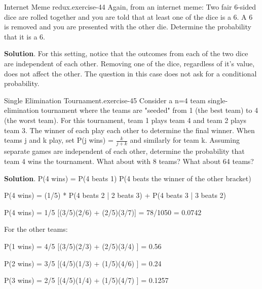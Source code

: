 \documentclass[10pt,]{book}
\numberwithin{equation}{section}
\begin{document}
%
\par
\hypertarget{p-639}{}%
\begin{inlineexercise}{Internet Meme redux.}{exercise-44}%
\hypertarget{p-640}{}%
Again, from an internet meme:  Two fair 6-sided dice are rolled together and you are told that at least one of the dice is a 6. A 6 is removed and you are presented with the other die.  Determine the probability that it is a 6.%
\par\smallskip%
\noindent\textbf{Solution}.\hypertarget{solution-21}{}\quad%
\hypertarget{p-641}{}%
For this setting, notice that the outcomes from each of the two dice are independent of each other. Removing one of the dice, regardless of it's value, does not affect the other. The question in this case does not ask for a conditional probability.%
\end{inlineexercise}
%
\par
\hypertarget{p-642}{}%
\begin{inlineexercise}{Single Elimination Tournament.}{exercise-45}%
\hypertarget{p-643}{}%
Consider a n=4 team single-elimination tournament where the teams are "seeded" from 1 (the best team) to 4 (the worst team).  For this tournament, team 1 plays team 4 and team 2 plays team 3. The winner of each play each other to determine the final winner. When teams j and k play, set P(j wins) = \(\frac{k}{j+k}\) and similarly for team k.  Assuming separate games are independent of each other, determine the probability that team 4 wins the tournament. What about with 8 teams? What about 64 teams?%
\par\smallskip%
\noindent\textbf{Solution}.\hypertarget{solution-22}{}\quad%
\hypertarget{p-644}{}%
P(4 wins) = P(4 beats 1) P(4 beats the winner of the other bracket)%
\par
\hypertarget{p-645}{}%
P(4 wins) = (1/5) * P(4 beats 2 | 2 beats 3) + P(4 beats 3 | 3 beats 2)%
\par
\hypertarget{p-646}{}%
P(4 wins) = 1/5 [(3/5)(2/6) + (2/5)(3/7)] = 78/1050 = 0.0742%
\par
\hypertarget{p-647}{}%
For the other teams:%
\par
\hypertarget{p-648}{}%
P(1 wins) = 4/5 [(3/5)(2/3) + (2/5)(3/4) ] = 0.56%
\par
\hypertarget{p-649}{}%
P(2 wins) = 3/5 [(4/5)(1/3) + (1/5)(4/6) ] = 0.24%
\par
\hypertarget{p-650}{}%
P(3 wins) = 2/5 [(4/5)(1/4) + (1/5)(4/7) ] = 0.1257%
\end{inlineexercise}
%
%
%
\typeout{************************************************}
\typeout{************************************************}
%
\end{document}
